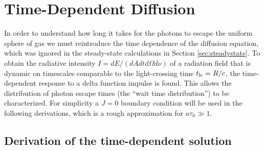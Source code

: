 \documentclass{aastex63}
\begin{document}
\section{Time-Dependent Diffusion}
\label{sec:time_dependent}

In order to understand how long it takes for the photons to escape the uniform sphere of gas we must reintroduce the time dependence of the diffusion equation, which was ignored in the steady-state calculations in Section \ref{sec:steadystate}. To obtain the radiative intensity $I=dE/(dAdtd\Omega d\nu)$ of a radiation field that is dynamic on timescales comparable to the light-crossing time $t_{\rm lc} = R/c$, the time-dependent response to a delta function impulse is found. This allows the distribution of photon escape times (the ``wait time distribution'') to be characterized. For simplicity a $J=0$ boundary condition will be used in the following derivations, which is a rough approximation for $a\tau_0 \gg 1$. 

\subsection{Derivation of the time-dependent solution}
\label{subsec:time_dependent:background}
\end{document}

